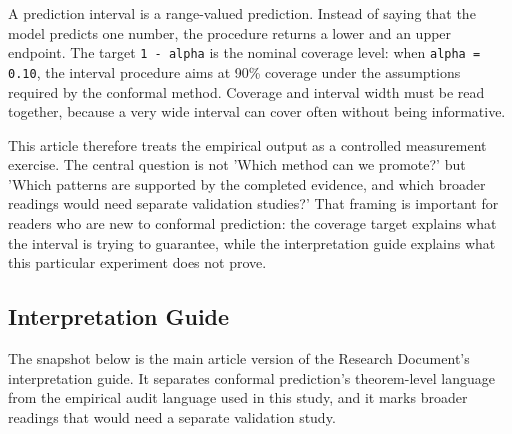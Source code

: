 \documentclass[11pt]{article}
\begin{document}
A prediction interval is a range-valued prediction. Instead of saying that the model predicts one number, the procedure returns a lower and an upper endpoint. The target \texttt{1 - alpha} is the nominal coverage level: when \texttt{alpha = 0.10}, the interval procedure aims at 90\% coverage under the assumptions required by the conformal method. Coverage and interval width must be read together, because a very wide interval can cover often without being informative.

This article therefore treats the empirical output as a controlled measurement exercise. The central question is not 'Which method can we promote?' but 'Which patterns are supported by the completed evidence, and which broader readings would need separate validation studies?' That framing is important for readers who are new to conformal prediction: the coverage target explains what the interval is trying to guarantee, while the interpretation guide explains what this particular experiment does not prove.

\subsection{Interpretation Guide}

The snapshot below is the main article version of the Research Document's interpretation guide. It separates conformal prediction's theorem-level language from the empirical audit language used in this study, and it marks broader readings that would need a separate validation study.
\end{document}
